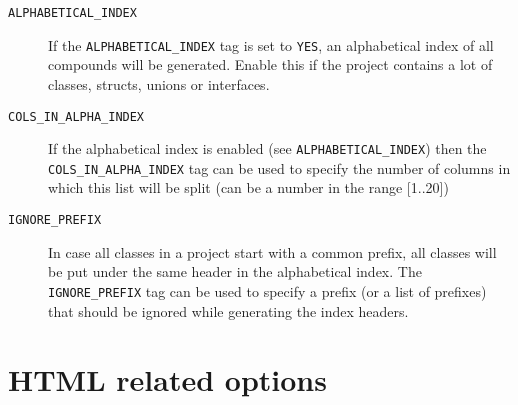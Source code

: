  \begin{description}
\item[{\tt ALPHABETICAL\_\-INDEX} ] If the {\tt ALPHABETICAL\_\-INDEX} tag is set to {\tt YES}, an alphabetical index of all compounds will be generated. Enable this if the project contains a lot of classes, structs, unions or interfaces.

\label{config_cfg_cols_in_alpha_index}
\hypertarget{config_cfg_cols_in_alpha_index}{}
 \item[{\tt COLS\_\-IN\_\-ALPHA\_\-INDEX} ] If the alphabetical index is enabled (see {\tt ALPHABETICAL\_\-INDEX}) then the {\tt COLS\_\-IN\_\-ALPHA\_\-INDEX} tag can be used to specify the number of columns in which this list will be split (can be a number in the range \mbox{[}1..20\mbox{]})

\label{config_cfg_ignore_prefix}
\hypertarget{config_cfg_ignore_prefix}{}
 \item[{\tt IGNORE\_\-PREFIX} ] In case all classes in a project start with a common prefix, all classes will be put under the same header in the alphabetical index. The {\tt IGNORE\_\-PREFIX} tag can be used to specify a prefix (or a list of prefixes) that should be ignored while generating the index headers.

\end{description}
\hypertarget{config_html_output}{}\section{HTML related options}\label{config_html_output}
\label{config_cfg_generate_html}
\hypertarget{config_cfg_generate_html}{}
